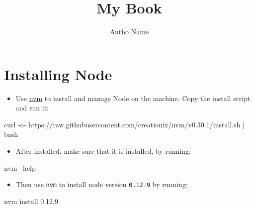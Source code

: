 \documentclass[12pt,]{article}
\title{My Book}
\author{Autho Name}
\date{}
\newenvironment{Shaded}{}{}
\newcommand{\KeywordTok}[1]{\textcolor[rgb]{0.00,0.00,1.00}{{#1}}}
\newcommand{\NormalTok}[1]{{#1}}
\providecommand{\tightlist}{%
  \setlength{\itemsep}{0pt}\setlength{\parskip}{0pt}}
\begin{document}
\maketitle

{
\hypersetup{linkcolor=black}
\setcounter{tocdepth}{5}
\tableofcontents
}
\section{Installing Node}\label{installing-node}

\begin{itemize}
\tightlist
\item
  Use \href{https://github.com/creationix/nvm}{nvm} to install and
  manage Node on the machine. Copy the install script and run it:
\end{itemize}

\begin{Shaded}
\begin{Highlighting}[numbers=left,,]
\KeywordTok{curl} \NormalTok{-o- https://raw.githubusercontent.com/creationix/nvm/v0.30.1/install.sh }\KeywordTok{|} \KeywordTok{bash}
\end{Highlighting}
\end{Shaded}

\begin{itemize}
\tightlist
\item
  After installed, make sure that it is installed, by running:
\end{itemize}

\begin{Shaded}
\begin{Highlighting}[numbers=left,,]
\KeywordTok{nvm} \NormalTok{--help}
\end{Highlighting}
\end{Shaded}

\begin{itemize}
\tightlist
\item
  Then use \texttt{nvm} to install node version \texttt{0.12.9} by
  running:
\end{itemize}

\begin{Shaded}
\begin{Highlighting}[numbers=left,,]
\KeywordTok{nvm} \NormalTok{install 0.12.9}
\end{Highlighting}
\end{Shaded}
\end{document}
